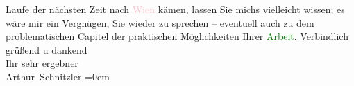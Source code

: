                    Laufe der nächsten Zeit nach \textcolor{pink}{Wien}{}\ledrightnote{\textcolor{pink}{Wien}} kämen, lassen
                    Sie michs vielleicht wissen; es wäre mir ein Vergnügen, Sie wieder zu sprechen –
                    eventuell auch zu dem problematischen Capitel der praktischen Möglichkeiten
                    Ihrer \textcolor{green}{Arbeit}{}.\pend
           \pstart
           Verbindlich grüßend u dankend{\\[\baselineskip]}Ihr sehr ergebner{\\[\baselineskip]}\spacefill\mbox{Arthur Schnitzler}\pend
           \leftskip=0em{}\endnumbering{}  
      